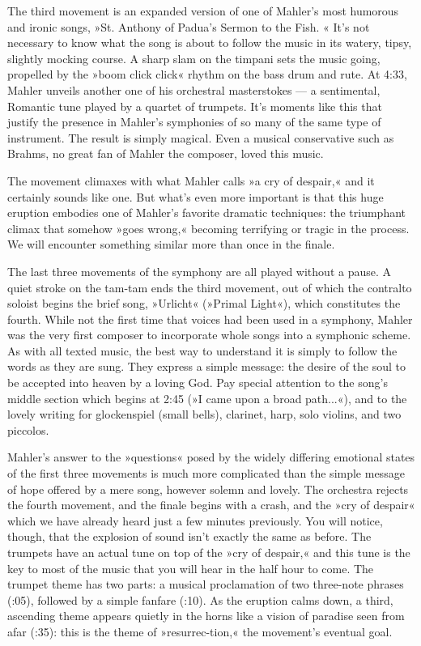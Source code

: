 \documentclass[12pt]{article}%
\begin{document}
The third movement is an expanded version of one of Mahler's most humorous and ironic songs, »St. Anthony of Padua's Sermon to the Fish. « It's not necessary to know what the song is about to follow the music in its watery, tipsy, slightly mocking course. A sharp slam on the timpani sets the music going, propelled by the
»boom click click« rhythm on the bass drum and rute. At 4:33, Mahler unveils another one of his orchestral masterstokes --- a sentimental, Romantic tune played by a quartet of trumpets.
It's moments like this that justify the presence in Mahler's symphonies of so many of the same type of instrument. The result is simply magical.
Even a musical conservative such as Brahms, no great fan of Mahler the composer, loved this music.

The movement climaxes with what Mahler calls
»a cry of despair,« and it certainly sounds like one. But what's even more important is that this huge eruption embodies one of Mahler's favorite dramatic techniques: the triumphant climax that somehow »goes wrong,« becoming terrifying or tragic in the process. We will encounter something similar more than once in the finale.

The last three movements of the symphony are all played without a pause. A quiet stroke on the tam-tam ends the third movement, out of which the contralto soloist begins the brief song, »Urlicht« (»Primal Light«), which constitutes the fourth. While not the first time that voices had been used in a symphony, Mahler was the very first composer to incorporate whole songs into a symphonic scheme. As with all texted music, the best way to understand it is simply to follow the words as they are sung.
They express a simple message: the desire of the soul to be accepted into heaven by a loving God. Pay special attention to the song's middle section which begins at 2:45 (»I came upon a broad path...«), and to the lovely writing for glockenspiel (small bells), clarinet, harp, solo violins, and two piccolos.

Mahler's answer to the »questions« posed by the widely differing emotional states of the first three movements is much more complicated than the simple message of hope offered by a mere song, however solemn and lovely. The orchestra rejects the fourth movement, and the finale begins with a crash, and the »cry of despair« which we have already heard just a few minutes previously. You will notice, though, that the explosion of sound isn't exactly the same as before. The trumpets have an actual tune on top of the »cry of despair,« and this tune is the key to most of the music that you will hear in the half hour to come. The trumpet theme has two parts: a musical proclamation of two three-note phrases (:05), followed by a simple fanfare (:10). As the eruption calms down, a third, ascending theme appears quietly in the horns like a vision of paradise seen from afar (:35): this is the theme of »resurrec-tion,« the movement's eventual goal.
\end{document}
